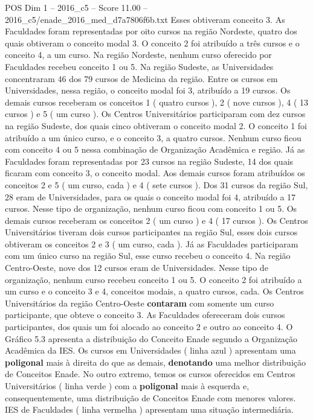 \begin{textsample}{POS Dim 1 – 2016\_c5 – Score 11.00 – 2016\_c5/enade\_2016\_med\_d7a7806f6b.txt}
Esses obtiveram conceito 3.
As Faculdades foram representadas por oito cursos na região Nordeste, quatro dos quais obtiveram o conceito modal 3.
O conceito 2 foi atribuído a três cursos e o conceito 4, a um curso.
Na região Nordeste, nenhum curso oferecido por Faculdades recebeu conceito 1 ou 5.
Na região Sudeste, as Universidades concentraram 46 dos 79 cursos de Medicina da região.
Entre os cursos em Universidades, nessa região, o conceito modal foi 3, atribuído a 19 cursos.
Os demais cursos receberam os conceitos 1 ( quatro cursos ), 2 ( nove cursos ), 4 ( 13 cursos ) e 5 ( um curso ).
Os Centros Universitários participaram com dez cursos na região Sudeste, dos quais cinco obtiveram o conceito modal 2.
O conceito 1 foi atribuído a um único curso, e o conceito 3, a quatro cursos.
Nenhum curso ficou com conceito 4 ou 5 nessa combinação de Organização Acadêmica e região.
Já as Faculdades foram representadas por 23 cursos na região Sudeste, 14 dos quais ficaram com conceito 3, o conceito modal.
Aos demais cursos foram atribuídos os conceitos 2 e 5 ( um curso, cada ) e 4 ( sete cursos ).
Dos 31 cursos da região Sul, 28 eram de Universidades, para os quais o conceito modal foi 4, atribuído a 17 cursos.
Nesse tipo de organização, nenhum curso ficou com conceito 1 ou 5.
Os demais cursos receberam os conceitos 2 ( um curso ) e 4 ( 17 cursos ).
Os Centros Universitários tiveram dois cursos participantes na região Sul, esses dois cursos obtiveram os conceitos 2 e 3 ( um curso, cada ).
Já as Faculdades participaram com um único curso na região Sul, esse curso recebeu o conceito 4.
Na região Centro-Oeste, nove dos 12 cursos eram de Universidades.
Nesse tipo de organização, nenhum curso recebeu conceito 1 ou 5.
O conceito 2 foi atribuído a um curso e o conceito 3 e 4, conceitos modais, a quatro cursos, cada.
Os Centros Universitários da região Centro-Oeste \textbf{contaram} com somente um curso participante, que obteve o conceito 3.
As Faculdades ofereceram dois cursos participantes, dos quais um foi alocado ao conceito 2 e outro ao conceito 4.
O Gráfico 5.3 apresenta a distribuição do Conceito Enade segundo a Organização Acadêmica da IES.
Os cursos em Universidades ( linha azul ) apresentam uma \textbf{poligonal} mais à direita do que as demais, \textbf{denotando} uma melhor distribuição de Conceitos Enade.
No outro extremo, temos os cursos oferecidos em Centros Universitários ( linha verde ) com a \textbf{poligonal} mais à esquerda e, consequentemente, uma distribuição de Conceitos Enade com menores valores.
IES de Faculdades ( linha vermelha ) apresentam uma situação intermediária.

\end{textsample}
